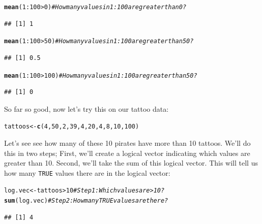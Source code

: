 \documentclass{tufte-book}\usepackage[]{graphicx}\usepackage[]{color}
\makeatletter
\newcommand{\hlnum}[1]{\textcolor[rgb]{0.686,0.059,0.569}{#1}}%
\newcommand{\hlcom}[1]{\textcolor[rgb]{0.678,0.584,0.686}{\textit{#1}}}%
\newcommand{\hlopt}[1]{\textcolor[rgb]{0,0,0}{#1}}%
\newcommand{\hlstd}[1]{\textcolor[rgb]{0.345,0.345,0.345}{#1}}%
\newcommand{\hlkwb}[1]{\textcolor[rgb]{0.69,0.353,0.396}{#1}}%
\newcommand{\hlkwd}[1]{\textcolor[rgb]{0.737,0.353,0.396}{\textbf{#1}}}%
\newenvironment{kframe}{%
 \def\at@end@of@kframe{}%
 \ifinner\ifhmode%
  \def\at@end@of@kframe{\end{minipage}}%
  \begin{minipage}{\columnwidth}%
 \fi\fi%
 \def\FrameCommand##1{\hskip\@totalleftmargin \hskip-\fboxsep
 \colorbox{shadecolor}{##1}\hskip-\fboxsep
     \hskip-\linewidth \hskip-\@totalleftmargin \hskip\columnwidth}%
 \MakeFramed {\advance\hsize-\width
   \@totalleftmargin\z@ \linewidth\hsize
   \@setminipage}}%
 {\par\unskip\endMakeFramed%
 \at@end@of@kframe}
\newenvironment{knitrout}{}{} %
\makeatother
\begin{document}
\begin{knitrout}
\color{fgcolor}\begin{kframe}
\begin{alltt}
\hlkwd{mean}\hlstd{(}\hlnum{1}\hlopt{:}\hlnum{100} \hlopt{>} \hlnum{0}\hlstd{)} \hlcom{# How many values in 1:100 are greater than 0?}
\end{alltt}
\begin{verbatim}
## [1] 1
\end{verbatim}
\begin{alltt}
\hlkwd{mean}\hlstd{(}\hlnum{1}\hlopt{:}\hlnum{100} \hlopt{>} \hlnum{50}\hlstd{)} \hlcom{# How many values in 1:100 are greater than 50?}
\end{alltt}
\begin{verbatim}
## [1] 0.5
\end{verbatim}
\begin{alltt}
\hlkwd{mean}\hlstd{(}\hlnum{1}\hlopt{:}\hlnum{100} \hlopt{>} \hlnum{100}\hlstd{)} \hlcom{# How many values in 1:100 are greater than 50?}
\end{alltt}
\begin{verbatim}
## [1] 0
\end{verbatim}
\end{kframe}
\end{knitrout}

So far so good, now let's try this on our tattoo data:

\begin{knitrout}
\color{fgcolor}\begin{kframe}
\begin{alltt}
\hlstd{tattoos} \hlkwb{<-} \hlkwd{c}\hlstd{(}\hlnum{4}\hlstd{,} \hlnum{50}\hlstd{,} \hlnum{2}\hlstd{,} \hlnum{39}\hlstd{,} \hlnum{4}\hlstd{,} \hlnum{20}\hlstd{,} \hlnum{4}\hlstd{,} \hlnum{8}\hlstd{,} \hlnum{10}\hlstd{,} \hlnum{100}\hlstd{)}
\end{alltt}
\end{kframe}
\end{knitrout}

Let's see see how many of these 10 pirates have more than 10 tattoos. We'll do this in two steps; First, we'll create a logical vector indicating which values are greater than 10. Second, we'll take the sum of this logical vector. This will tell us how many \texttt{TRUE} values there are in the logical vector:

\begin{knitrout}
\color{fgcolor}\begin{kframe}
\begin{alltt}
\hlstd{log.vec} \hlkwb{<-} \hlstd{tattoos} \hlopt{>} \hlnum{10} \hlcom{# Step 1: Which values are > 10?}
\hlkwd{sum}\hlstd{(log.vec)} \hlcom{# Step 2: How many TRUE values are there?}
\end{alltt}
\begin{verbatim}
## [1] 4
\end{verbatim}
\end{kframe}
\end{knitrout}
\end{document}
